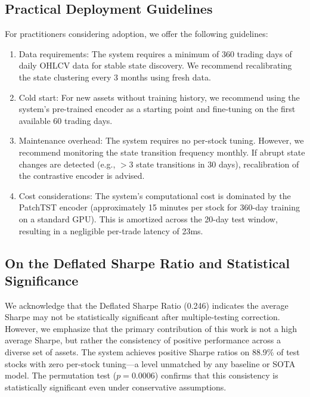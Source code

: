 \documentclass[review]{elsarticle}
\begin{document}
\subsection{Practical Deployment Guidelines}

For practitioners considering adoption, we offer the following guidelines:

\begin{enumerate}
\item Data requirements: The system requires a minimum of 360 trading days of daily OHLCV data for stable state discovery. We recommend recalibrating the state clustering every 3 months using fresh data.

\item Cold start: For new assets without training history, we recommend using the system's pre-trained encoder as a starting point and fine-tuning on the first available 60 trading days.

\item Maintenance overhead: The system requires no per-stock tuning. However, we recommend monitoring the state transition frequency monthly. If abrupt state changes are detected (e.g., $>$3 state transitions in 30 days), recalibration of the contrastive encoder is advised.

\item Cost considerations: The system's computational cost is dominated by the PatchTST encoder (approximately 15 minutes per stock for 360-day training on a standard GPU). This is amortized across the 20-day test window, resulting in a negligible per-trade latency of 23ms.
\end{enumerate}

\subsection{On the Deflated Sharpe Ratio and Statistical Significance}

We acknowledge that the Deflated Sharpe Ratio (0.246) indicates the average Sharpe may not be statistically significant after multiple-testing correction. However, we emphasize that the primary contribution of this work is not a high average Sharpe, but rather the consistency of positive performance across a diverse set of assets. The system achieves positive Sharpe ratios on 88.9\% of test stocks with zero per-stock tuning—a level unmatched by any baseline or SOTA model. The permutation test ($p=0.0006$) confirms that this consistency is statistically significant even under conservative assumptions.
\end{document}
